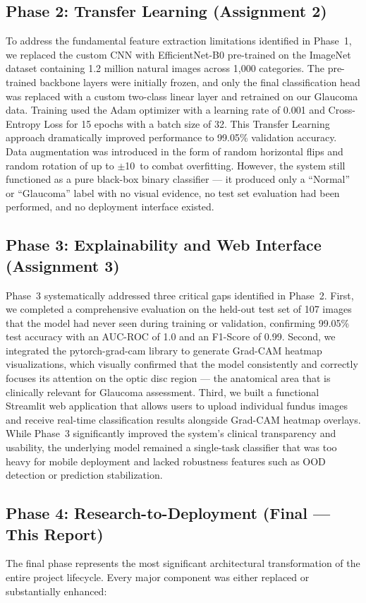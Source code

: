 \documentclass[conference]{IEEEtran}
\begin{document}
\subsection{Phase 2: Transfer Learning (Assignment 2)}
To address the fundamental feature extraction limitations identified in Phase~1, we replaced the custom CNN with EfficientNet-B0 pre-trained on the ImageNet dataset containing 1.2 million natural images across 1,000 categories. The pre-trained backbone layers were initially frozen, and only the final classification head was replaced with a custom two-class linear layer and retrained on our Glaucoma data. Training used the Adam optimizer with a learning rate of 0.001 and Cross-Entropy Loss for 15 epochs with a batch size of 32. This Transfer Learning approach dramatically improved performance to 99.05\% validation accuracy. Data augmentation was introduced in the form of random horizontal flips and random rotation of up to $\pm$10\textdegree\ to combat overfitting. However, the system still functioned as a pure black-box binary classifier --- it produced only a ``Normal'' or ``Glaucoma'' label with no visual evidence, no test set evaluation had been performed, and no deployment interface existed.

\subsection{Phase 3: Explainability and Web Interface (Assignment 3)}
Phase~3 systematically addressed three critical gaps identified in Phase~2. First, we completed a comprehensive evaluation on the held-out test set of 107 images that the model had never seen during training or validation, confirming 99.05\% test accuracy with an AUC-ROC of 1.0 and an F1-Score of 0.99. Second, we integrated the pytorch-grad-cam library to generate Grad-CAM heatmap visualizations, which visually confirmed that the model consistently and correctly focuses its attention on the optic disc region --- the anatomical area that is clinically relevant for Glaucoma assessment. Third, we built a functional Streamlit web application that allows users to upload individual fundus images and receive real-time classification results alongside Grad-CAM heatmap overlays. While Phase~3 significantly improved the system's clinical transparency and usability, the underlying model remained a single-task classifier that was too heavy for mobile deployment and lacked robustness features such as OOD detection or prediction stabilization.

\subsection{Phase 4: Research-to-Deployment (Final --- This Report)}
The final phase represents the most significant architectural transformation of the entire project lifecycle. Every major component was either replaced or substantially enhanced:
\end{document}
